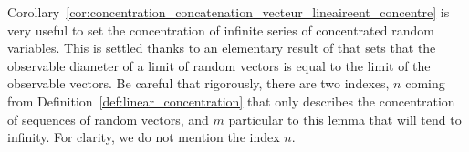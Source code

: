 \documentclass{ws-rmta}
\begin{document}
Corollary~\ref{cor:concentration_concatenation_vecteur_lineaireent_concentre} is very useful to set the concentration of infinite series of concentrated random variables. This is settled thanks to an elementary result of \cite{LOU19} that sets that the observable diameter of a limit of random vectors is equal to the limit of the observable vectors. Be careful that rigorously, there are two indexes, $n$ coming from Definition~\ref{def:linear_concentration} that only describes the concentration of sequences of random vectors, and $m$ particular to this lemma that will tend to infinity. For clarity, we do not mention the index $n$. %
\begin{lemma}\label{lem:passage_a_la_limite_dans_la_concetration}

\end{lemma}
\end{document}
